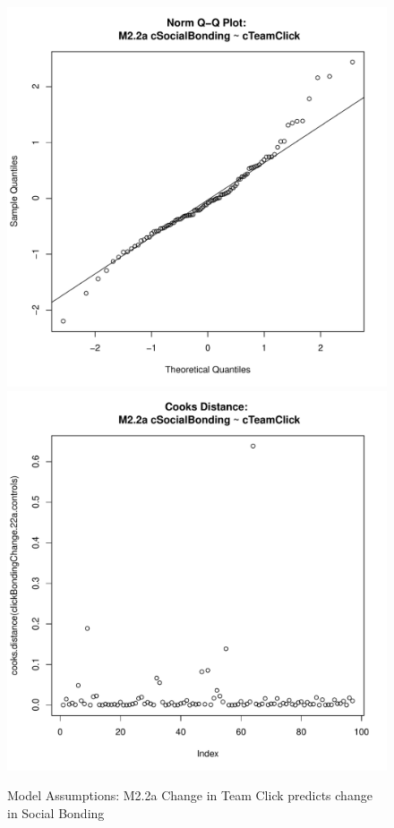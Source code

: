 {\begin{figure}[htbp]
  \includegraphics[scale =.4]{images/MLM22aQQNorm.pdf}
  \includegraphics[scale =.4]{images/MLM22aCooksD.pdf}
  \caption{Model Assumptions: M2.2a Change in Team Click predicts change in Social Bonding}
  \label{fig:MLM22aAssumptions}
\end{figure}


}
